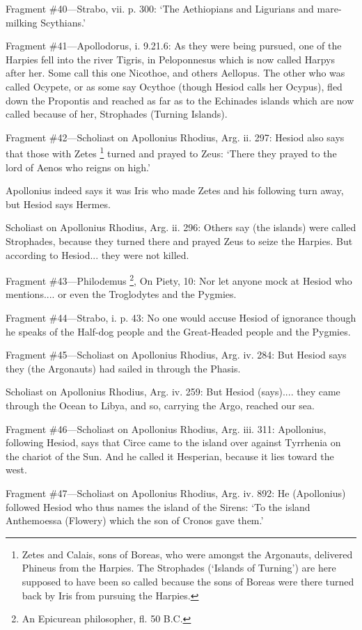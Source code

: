 Fragment \#40—Strabo, vii. p. 300: ‘The Aethiopians and Ligurians
and mare-milking Scythians.’

Fragment \#41—Apollodorus, i. 9.21.6: As they were being pursued, one of
the Harpies fell into the river Tigris, in Peloponnesus which is now called
Harpys after her. Some call this one Nicothoe, and others Aellopus. The other
who was called Ocypete, or as some say Ocythoe (though Hesiod calls her
Ocypus), fled down the Propontis and reached as far as to the Echinades islands
which are now called because of her, Strophades (Turning Islands).

Fragment \#42—Scholiast on Apollonius Rhodius, Arg. ii. 297: Hesiod also
says that those with Zetes \footnote{Zetes and Calais, sons of
Boreas, who were amongst the Argonauts, delivered Phineus from the Harpies. The
Strophades (‘Islands of Turning’) are here supposed to have been so
called because the sons of Boreas were there turned back by Iris from pursuing
the Harpies.} turned and prayed to Zeus:
‘There they prayed to the lord of Aenos who reigns on high.’

Apollonius indeed says it was Iris who made Zetes and his following turn away,
but Hesiod says Hermes.

Scholiast on Apollonius Rhodius, Arg. ii. 296: Others say (the islands) were
called Strophades, because they turned there and prayed Zeus to seize the
Harpies. But according to Hesiod... they were not killed.

Fragment \#43—Philodemus \footnote{An Epicurean philosopher,
fl. 50 B.C.}, On Piety, 10: Nor let anyone
mock at Hesiod who mentions.... or even the Troglodytes and the Pygmies.

Fragment \#44—Strabo, i. p. 43: No one would accuse Hesiod of ignorance
though he speaks of the Half-dog people and the Great-Headed people and the
Pygmies.

Fragment \#45—Scholiast on Apollonius Rhodius, Arg. iv. 284: But Hesiod
says they (the Argonauts) had sailed in through the Phasis.

Scholiast on Apollonius Rhodius, Arg. iv. 259: But Hesiod (says).... they came
through the Ocean to Libya, and so, carrying the Argo, reached our sea.

Fragment \#46—Scholiast on Apollonius Rhodius, Arg. iii. 311: Apollonius,
following Hesiod, says that Circe came to the island over against Tyrrhenia on
the chariot of the Sun. And he called it Hesperian, because it lies toward the
west.

Fragment \#47—Scholiast on Apollonius Rhodius, Arg. iv. 892: He
(Apollonius) followed Hesiod who thus names the island of the Sirens: ‘To
the island Anthemoessa (Flowery) which the son of Cronos gave them.’

